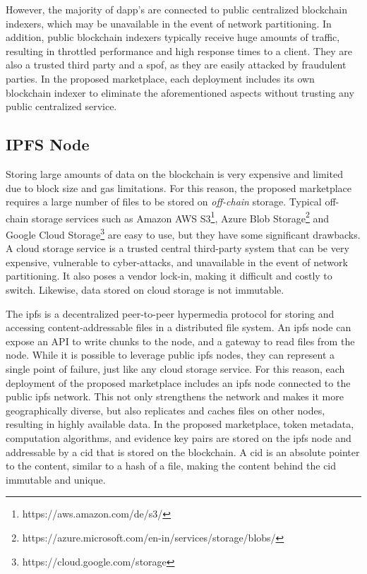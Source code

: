 However, the majority of \acrshort{dapp}'s are connected to public centralized blockchain indexers, which may be unavailable in the event of network partitioning. In addition, public blockchain indexers typically receive huge amounts of traffic, resulting in throttled performance and high response times to a client. They are also a trusted third party and a \acrfull{spof}, as they are easily attacked by fraudulent parties. In the proposed marketplace, each deployment includes its own blockchain indexer to eliminate the aforementioned aspects without trusting any public centralized service.
            
\subsection{IPFS Node}
\label{subsec:ipfs}

Storing large amounts of data on the blockchain is very expensive and limited due to block size and gas limitations. For this reason, the proposed marketplace requires a large number of files to be stored on \emph{off-chain} storage. Typical off-chain storage services such as Amazon AWS S3\footnote{https://aws.amazon.com/de/s3/}, Azure Blob Storage\footnote{https://azure.microsoft.com/en-in/services/storage/blobs/} and Google Cloud Storage\footnote{https://cloud.google.com/storage} are easy to use, but they have some significant drawbacks. A cloud storage service is a trusted central third-party system that can be very expensive, vulnerable to cyber-attacks, and unavailable in the event of network partitioning. It also poses a vendor lock-in, making it difficult and costly to switch. Likewise, data stored on cloud storage is not immutable.

The \acrfull{ipfs} is a decentralized peer-to-peer hypermedia protocol for storing and accessing content-addressable files in a distributed file system. An \acrshort{ipfs} node can expose an API to write chunks to the node, and a gateway to read files from the node. While it is possible to leverage public \acrshort{ipfs} nodes, they can represent a single point of failure, just like any cloud storage service. For this reason, each deployment of the proposed marketplace includes an \acrshort{ipfs} node connected to the public \acrshort{ipfs} network. This not only strengthens the network and makes it more geographically diverse, but also replicates and caches files on other nodes, resulting in highly available data. In the proposed marketplace, token metadata, computation algorithms, and evidence key pairs are stored on the \acrshort{ipfs} node and addressable by a \acrfull{cid} that is stored on the blockchain. A \acrshort{cid} is an absolute pointer to the content, similar to a hash of a file, making the content behind the \acrshort{cid} immutable and unique.
            

